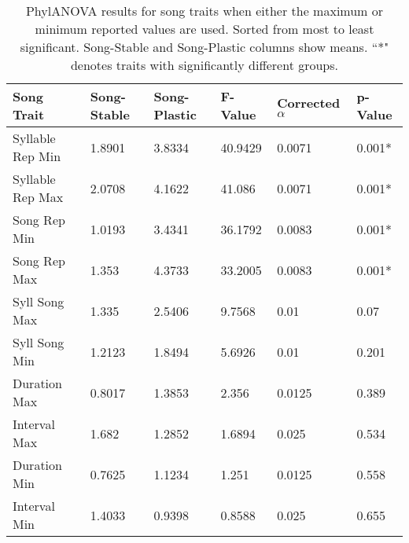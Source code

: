 \documentclass[a4paper,12pt]{article}
\begin{document}
\newcommand{\beginsupplement}{%
        \setcounter{table}{0}
        \renewcommand{\thetable}{S\arabic{table}}%
        \setcounter{figure}{0}
        \renewcommand{\thefigure}{S\arabic{figure}}%
     }

\beginsupplement
\setcounter{page}{13}





\begin{table}[ht]
\caption{PhylANOVA results for song traits when either the maximum or minimum reported values are used.  Sorted from most to least significant.  Song-Stable and Song-Plastic columns show means.  ``*" denotes traits with significantly different groups.}
\centering
\begin{tabular}{llllll}
  \hline
Song Trait & Song-Stable & Song-Plastic & F-Value & Corrected $\alpha$ & p-Value \\ 
  \hline
Syllable Rep Min & 1.8901 & 3.8334 & 40.9429 & 0.0071 & 0.001* \\ 
  Syllable Rep Max & 2.0708 & 4.1622 & 41.086 & 0.0071 & 0.001* \\ 
  Song Rep Min & 1.0193 & 3.4341 & 36.1792 & 0.0083 & 0.001* \\ 
  Song Rep Max & 1.353 & 4.3733 & 33.2005 & 0.0083 & 0.001* \\ 
  Syll Song Max & 1.335 & 2.5406 & 9.7568 & 0.01 & 0.07 \\ 
  Syll Song Min & 1.2123 & 1.8494 & 5.6926 & 0.01 & 0.201 \\ 
  Duration Max & 0.8017 & 1.3853 & 2.356 & 0.0125 & 0.389 \\ 
  Interval Max & 1.682 & 1.2852 & 1.6894 & 0.025 & 0.534 \\ 
  Duration Min & 0.7625 & 1.1234 & 1.251 & 0.0125 & 0.558 \\ 
  Interval Min & 1.4033 & 0.9398 & 0.8588 & 0.025 & 0.655 \\ 
   \hline
\end{tabular}
\end{table}
\end{document}
